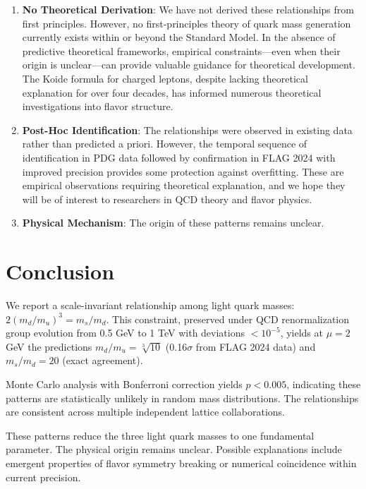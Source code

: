 \documentclass[12pt]{article}
\begin{document}
\begin{enumerate}
\item \textbf{No Theoretical Derivation}: We have not derived these relationships from first principles. However, no first-principles theory of quark mass generation currently exists within or beyond the Standard Model. In the absence of predictive theoretical frameworks, empirical constraints—even when their origin is unclear—can provide valuable guidance for theoretical development. The Koide formula for charged leptons, despite lacking theoretical explanation for over four decades, has informed numerous theoretical investigations into flavor structure.

\item \textbf{Post-Hoc Identification}: The relationships were observed in existing data rather than predicted a priori. However, the temporal sequence of identification in PDG data followed by confirmation in FLAG 2024 with improved precision provides some protection against overfitting. These are empirical observations requiring theoretical explanation, and we hope they will be of interest to researchers in QCD theory and flavor physics.

\item \textbf{Physical Mechanism}: The origin of these patterns remains unclear.
\end{enumerate}

\section{Conclusion}

We report a scale-invariant relationship among light quark masses: $2(m_d/m_u)^3 = m_s/m_d$. This constraint, preserved under QCD renormalization group evolution from 0.5 GeV to 1 TeV with deviations $<10^{-5}$, yields at $\mu=2$ GeV the predictions $m_d/m_u = \sqrt[3]{10}$ (0.16$\sigma$ from FLAG 2024 data) and $m_s/m_d = 20$ (exact agreement).

Monte Carlo analysis with Bonferroni correction yields $p < 0.005$, indicating these patterns are statistically unlikely in random mass distributions. The relationships are consistent across multiple independent lattice collaborations.

These patterns reduce the three light quark masses to one fundamental parameter. The physical origin remains unclear. Possible explanations include emergent properties of flavor symmetry breaking or numerical coincidence within current precision.
\end{document}
